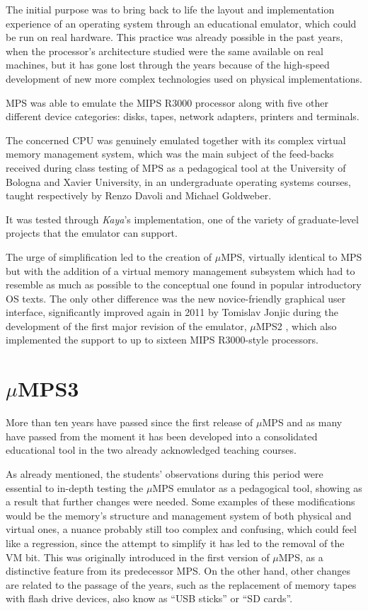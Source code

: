 \documentclass[12pt,a4paper,openright,twoside]{report}
\begin{document}
	The initial purpose was to bring back to life the layout and implementation experience of an operating system through an educational emulator, which could be run on real hardware.
	This practice was already possible in the past years, when the processor's architecture studied were the same available on real machines, but it has gone lost through the years because of the high-speed development of new more complex technologies used on physical implementations.
	
	MPS was able to emulate the MIPS R3000 processor along with five other different device categories: disks, tapes, network adapters, printers and terminals.
	
	The concerned CPU was genuinely emulated together with its complex virtual memory management system, which was the main subject of the feed-backs received during class testing of MPS as a pedagogical tool at the University of Bologna and Xavier University, in an undergraduate operating systems courses, taught respectively by Renzo Davoli and Michael Goldweber.
	
	It was tested through \textit{Kaya}'s \cite{kaya} implementation, one of the variety of graduate-level projects that the emulator can support.
	
	The urge of simplification led to the creation of $\mu$MPS, virtually identical to MPS but with the addition of a virtual memory management subsystem which had to resemble as much as possible to the conceptual one found in popular introductory OS texts.
	The only other difference was the new novice-friendly graphical user interface, significantly improved again in 2011 by Tomislav Jonjic during the development of the first major revision of the emulator, $\mu$MPS2 \cite{umps2}, which also implemented the support to up to sixteen MIPS R3000-style processors.

\section{$\mu$MPS3}
	More than ten years have passed since the first release of $\mu$MPS and as many have passed from the moment it has been developed into a consolidated educational tool in the two already acknowledged teaching courses.
	
	As already mentioned, the students' observations during this period were essential to in-depth testing the $\mu$MPS emulator as a pedagogical tool, showing as a result that further changes were needed.
	Some examples of these modifications would be the memory's structure and management system of both physical and virtual ones, a nuance probably still too complex and confusing, which could feel like a regression, since the attempt to simplify it has led to the removal of the VM bit.
	This was originally introduced in the first version of $\mu$MPS, as a distinctive feature from its predecessor MPS.
	On the other hand, other changes are related to the passage of the years, such as the replacement of memory tapes with flash drive devices, also know as ``USB sticks'' or ``SD cards''.
	
\end{document}
